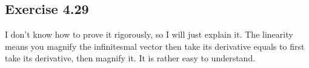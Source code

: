 \documentclass[]{ctexart}
\begin{document}
	\subsection{Exercise 4.29}
		I don't know how to prove it rigorously, so I will just explain it. The linearity means you magnify the infinitesmal vector then take its derivative equals to first take its derivative, then magnify it. It is rather easy to understand. 
		
			\begin{center}
				
				\begin{tikzpicture}[x=0.75pt,y=0.75pt,yscale=-1,xscale=1]
				

\end{tikzpicture}
\end{center}
\end{document}
